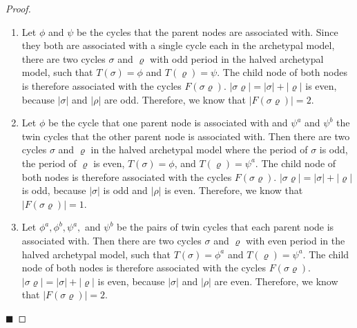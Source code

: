 \begin{proof} \phantom{x}
	\begin{enumerate}
		\item Let $\phi$ and $\psi$ be the cycles that the parent nodes are associated with.
		      Since they both are associated with a single cycle each in the archetypal model, there are two cycles $\sigma$ and $\varrho$ with odd period in the halved archetypal model, such that $T(\sigma) = \phi$ and $T(\varrho) = \psi$.
		      The child node of both nodes is therefore associated with the cycles $F(\sigma\varrho)$.
		      $|\sigma\varrho| = |\sigma| + |\varrho|$ is even, because $|\sigma|$ and $|\rho|$ are odd.
		      Therefore, we know that $\left|F(\sigma\varrho)\right| = 2$.
		\item Let $\phi$ be the cycle that one parent node is associated with and $\psi^a$ and $\psi^b$ the twin cycles that the other parent node is associated with.
		      Then there are two cycles $\sigma$ and $\varrho$ in the halved archetypal model where the period of $\sigma$ is odd, the period of $\varrho$ is even, $T(\sigma) = \phi$, and $T(\varrho) = \psi^a$.
		      The child node of both nodes is therefore associated with the cycles $F(\sigma\varrho)$.
		      $|\sigma\varrho| = |\sigma| + |\varrho|$ is odd, because $|\sigma|$ is odd and $|\rho|$ is even.
		      Therefore, we know that $\left|F(\sigma\varrho)\right| = 1$.
		\item Let $\phi^a, \phi^b, \psi^a,$ and $\psi^b$ be the pairs of twin cycles that each parent node is associated with.
		      Then there are two cycles $\sigma$ and $\varrho$ with even period in the halved archetypal model, such that $T(\sigma) = \phi^a$ and $T(\varrho) = \psi^a$.
		      The child node of both nodes is therefore associated with the cycles $F(\sigma\varrho)$.
		      $|\sigma\varrho| = |\sigma| + |\varrho|$ is even, because $|\sigma|$ and $|\rho|$ are even.
		      Therefore, we know that $\left|F(\sigma\varrho)\right| = 2$.
	\end{enumerate}
	\hfill $\blacksquare$
\end{proof}

